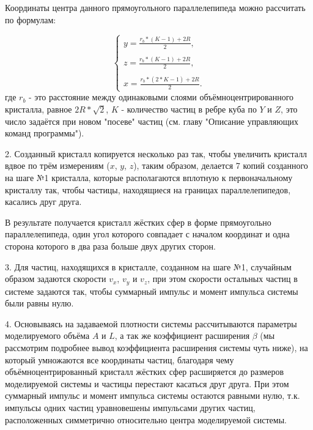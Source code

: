\documentclass[a4paper]{article}
\begin{document}
Координаты центра данного прямоугольного параллелепипеда можно рассчитать по формулам:

\begin{equation}\label{eq:r_scalar}
    \begin{cases}
        y = \displaystyle\frac{r_b * (K - 1) + 2R}{2},
        \\
        \\
        z = \displaystyle\frac{r_b * (K - 1) + 2R}{2},
        \\
        \\
        x = \displaystyle\frac{r_b * (2 * K - 1) + 2R}{2}.
    \end{cases}
\end{equation}
где $ r_b $ - это расстояние между одинаковыми слоями объёмноцентрированного кристалла, равное $ 2R*\sqrt{2} $, $ K $ - количество частиц в ребре куба по $ Y $ и $ Z $, это число задаётся при новом "посеве" частиц (см. главу "Описание управляющих команд программы").

2. Созданный кристалл копируется несколько раз так, чтобы увеличить кристалл вдвое по трём измерениям ($x$, $y$, $z$), таким образом, делается 7 копий созданного на шаге №1 кристалла, которые располагаются вплотную к первоначальному кристаллу так, чтобы частицы, находящиеся на границах параллелепипедов, касались друг друга.

В результате получается кристалл жёстких сфер в форме прямоугольно параллелепипеда, один угол которого совпадает с началом координат и одна сторона которого в два раза больше двух других сторон.

3. Для частиц, находящихся в кристалле, созданном на шаге №1, случайным образом задаются скорости $ v_x $, $ v_y $ и $ v_z $, при этом скорости остальных частиц в системе задаются так, чтобы суммарный импульс и момент импульса системы были равны нулю.

4. Основываясь на задаваемой плотности системы рассчитываются параметры моделируемого объёма $ A $ и $ L $, а так же коэффициент расширения $ \beta $ (мы рассмотрим подробнее вывод коэффициента расширения системы чуть ниже), на который умножаются все координаты частиц, благодаря чему объёмноцентрированный кристалл жёстких сфер расширяется до размеров моделируемой системы и частицы перестают касаться друг друга. При этом суммарный импульс и момент импульса системы остаются равными нулю, т.к. импульсы одних частиц уравновешены импульсами других частиц, расположенных симметрично относительно центра моделируемой системы.
\end{document}
